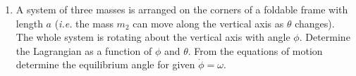 \documentclass[letterpaper,11pt]{article}
\begin{document}
\begin{enumerate}
\begin{center}
 \end{center}
 \item A system of three masses is arranged on the corners of a foldable frame with length $a$ (\textit{i.e.} the mass $m_2$ can move along the vertical axis as $\theta$ changes).  The whole system is rotating about the vertical axis with angle $\phi$.  Determine the Lagrangian as a function of $\phi$ and $\theta$.  From the equations of motion determine the equilibrium angle for given $\dot\phi = \omega$.
 \begin{center}
 \end{center}
\end{enumerate}
\end{document}
